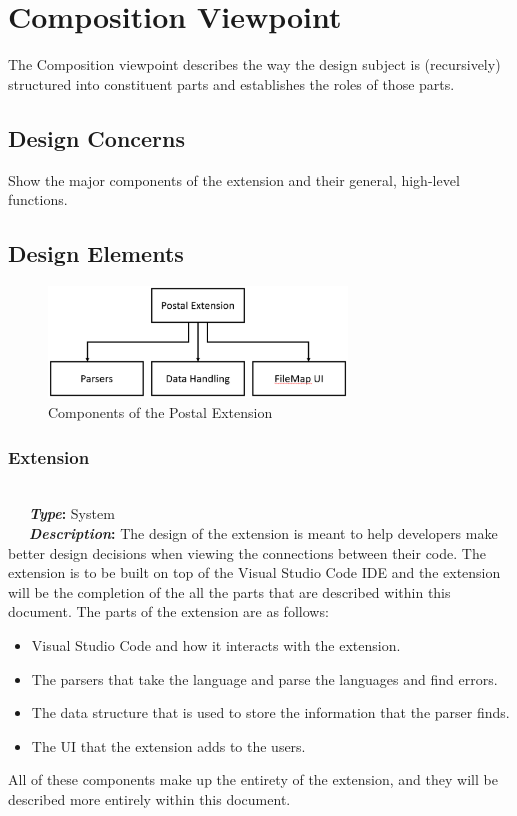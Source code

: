 \documentclass[letterpaper,10pt,titlepage,draftclsnofoot,onecolumn,onesided] {IEEEtran}
\newcommand{\bolditin}[2]{
	\-\ \-\ \-\ \textbf{\textit{#1}#2}
}
\begin{document}
\section{Composition Viewpoint}
The Composition viewpoint describes the way the design subject is (recursively) structured into constituent
parts and establishes the roles of those parts. 
\subsection{Design Concerns}
Show the major components of the extension and their general, high-level functions.
\subsection{Design Elements}
\begin{figure}[h!]
	\includegraphics[width=300px]{CompositionUMLEPS.eps}
	\caption{Components of the Postal Extension}
\end{figure}

\subsubsection{Extension}
\hfill \\
\bolditin{Type}{:} System \\
\bolditin{Description}{:}  The design of the extension is meant to help developers make better design decisions when viewing the connections between their code.
The extension is to be built on top of the Visual Studio Code IDE and the extension will be the completion of the all the parts that are described within this document. 
The parts of the extension are as follows:
\begin{itemize}
	\item Visual Studio Code and how it interacts with the extension.
	\item The parsers that take the language and parse the languages and find errors.
	\item The data structure that is used to store the information that the parser finds.
	\item The UI that the extension adds to the users. 
\end{itemize}
All of these components make up the entirety of the extension, and they will be described more entirely within this document. 
	
\end{document}

